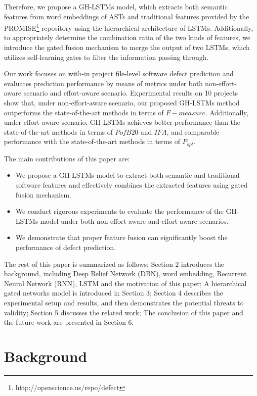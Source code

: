 \documentclass[journal]{IEEEtran}
\begin{document}
Therefore, we propose a GH-LSTMs model, which extracts both semantic features from word embeddings of ASTs and traditional features provided by the PROMISE\footnote{http://openscience.us/repo/defect} repository using the hierarchical architecture of LSTMs. Additionally, to appropriately determine the combination ratio of the two kinds of features, we introduce the gated fusion mechanism to merge the output of two LSTMs, which utilizes self-learning gates to filter the information passing through.


Our work focuses on with-in project file-level software defect prediction and evaluates prediction performance by means of metrics under both non-effort-aware scenario and effort-aware scenario. Experimental results on 10 projects show that, under non-effort-aware scenario, our proposed GH-LSTMs method outperforms the state-of-the-art methods in terms of $F-measure$. Additionally, under effort-aware scenario, GH-LSTMs achieves better performance than the state-of-the-art methods in terms of $PofB20$ and $IFA$, and comparable performance with the state-of-the-art methods in terms of $P_{opt}$.


The main contributions of this paper are:
\begin{itemize}
	\item We propose a GH-LSTMs model to extract both semantic and traditional software features and effectively combines the extracted features using gated fusion mechanism.
	\item We conduct rigorous experiments to evaluate the performance of the GH-LSTMs model under both non-effort-aware and effort-aware scenarios.
	\item We demonstrate that proper feature fusion can significantly boost the performance of defect prediction.
\end{itemize}


The rest of this paper is summarized as follows: Section 2 introduces the background, including Deep Belief Network (DBN), word embedding, Recurrent Neural Network (RNN), LSTM and the motivation of this paper; A hierarchical gated networks model is introduced in Section 3; Section 4 describes the experimental setup and results, and then demonstrates the potential threats to validity; Section 5 discusses the related work; The conclusion of this paper and the future work are presented in Section 6.

\section{Background}
\end{document}
